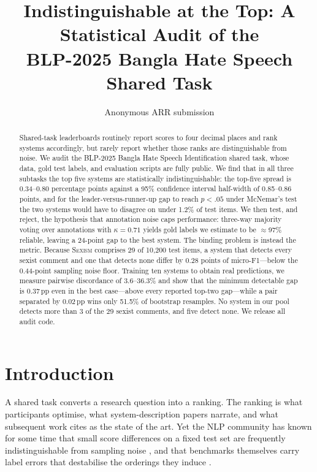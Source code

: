 \documentclass[11pt]{article}
\title{Indistinguishable at the Top: A Statistical Audit of the\\
       BLP-2025 Bangla Hate Speech Shared Task}
\author{Anonymous ARR submission}
\begin{document}
\maketitle

\begin{abstract}
Shared-task leaderboards routinely report scores to four decimal places and rank
systems accordingly, but rarely report whether those ranks are distinguishable
from noise. We audit the BLP-2025 Bangla Hate Speech Identification shared task,
whose data, gold test labels, and evaluation scripts are fully public. We find
that in all three subtasks the top five systems are statistically
indistinguishable: the top-five spread is 0.34--0.80 percentage points against a
95\% confidence interval half-width of 0.85--0.86 points, and for the
leader-versus-runner-up gap to reach $p<.05$ under McNemar's test the two systems
would have to disagree on under 1.2\% of test items. We then test, and reject,
the hypothesis that annotation noise caps performance: three-way majority voting
over annotations with $\kappa=0.71$ yields gold labels we estimate to be
$\approx$97\% reliable, leaving a 24-point gap to the best system. The binding
problem is instead the metric. Because \textsc{Sexism} comprises 29 of 10{,}200
test items, a system that detects every sexist comment and one that detects none
differ by 0.28 points of micro-F1---below the 0.44-point sampling noise floor.
Training ten systems to obtain real predictions, we measure pairwise discordance
of 3.6--36.3\% and show that the minimum detectable gap is 0.37\,pp even in the
best case---above every reported top-two gap---while a pair separated by
0.02\,pp wins only 51.5\% of bootstrap resamples. No system in our pool detects
more than 3 of the 29 sexist comments, and five detect none. We release all
audit code.
\end{abstract}

\section{Introduction}
\label{sec:intro}

A shared task converts a research question into a ranking. The ranking is what
participants optimise, what system-description papers narrate, and what
subsequent work cites as the state of the art. Yet the NLP community has known
for some time that small score differences on a fixed test set are frequently
indistinguishable from sampling noise
\citep{reimers2017reporting,dror2018hitchhiker,card2020power}, and that
benchmarks themselves carry label errors that destabilise the orderings they
induce \citep{northcutt2021labelerrors,bowman2021benchmarking}.
\end{document}
